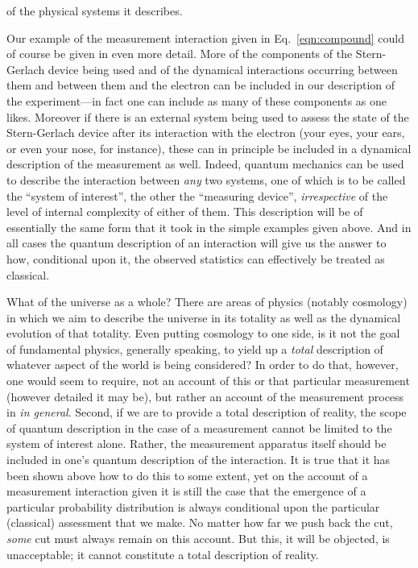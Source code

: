 of the physical systems it describes.

Our example of the measurement interaction given in Eq.\ \eqref{eqn:compound} could of course be given in even more detail. More of the components of the Stern-Gerlach device being used and of the dynamical interactions occurring between them and between them and the electron can be included in our description of the experiment---in fact one can include as many of these components as one likes. Moreover if there is an external system being used to assess the state of the Stern-Gerlach device after its interaction with the electron (your eyes, your ears, or even your nose, for instance), these can in principle be included in a dynamical description of the measurement as well. Indeed, quantum mechanics can be used to describe the interaction between \emph{any} two systems, one of which is to be called the ``system of interest'', the other the ``measuring device'', \emph{irrespective} of the level of internal complexity of either of them. This description will be of essentially the same form that it took in the simple examples given above. And in all cases the quantum description of an interaction will give us the answer to how, conditional upon it, the observed statistics can effectively be treated as classical.

What of the universe as a whole? There are areas of physics (notably cosmology) in which we aim to describe the universe in its totality as well as the dynamical evolution of that totality. Even putting cosmology to one side, is it not the goal of fundamental physics, generally speaking, to yield up a \emph{total} description of whatever aspect of the world is being considered? In order to do that, however, one would seem to require, not an account of this or that particular measurement (however detailed it may be), but rather an account of the measurement process in \emph{in general}. Second, if we are to provide a total description of reality, the scope of quantum description in the case of a measurement cannot be limited to the system of interest alone. Rather, the measurement apparatus itself should be included in one's quantum description of the interaction. It is true that it has been shown above how to do this to some extent, yet on the account of a measurement interaction given it is still the case that the emergence of a particular probability distribution is always conditional upon the particular (classical) assessment that we make. No matter how far we push back the cut, \emph{some} cut must always remain on this account. But this, it will be objected, is unacceptable; it cannot constitute a total description of reality.

